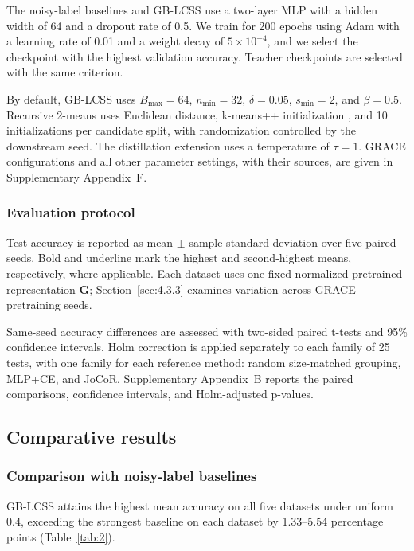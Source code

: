 \documentclass[times,review,10pt]{elsarticle}
\theoremstyle{definition}
\theoremstyle{plain}
\begin{document}
The noisy-label baselines and GB-LCSS use a two-layer MLP with a hidden width of 64 and a dropout rate of 0.5. We train for 200 epochs using Adam with a learning rate of 0.01 and a weight decay of \(5 \times 10^{- 4}\), and we select the checkpoint with the highest validation accuracy. Teacher checkpoints are selected with the same criterion.

By default, GB-LCSS uses \(B_{\max} = 64\), \(n_{\min} = 32\), \(\delta = 0.05\), \(s_{\min} = 2\), and \(\beta = 0.5\). Recursive 2-means uses Euclidean distance, k-means++ initialization \cite{ref71}, and 10 initializations per candidate split, with randomization controlled by the downstream seed. The distillation extension uses a temperature of \(\tau = 1\). GRACE configurations and all other parameter settings, with their sources, are given in Supplementary Appendix~F.

\subsubsection{Evaluation protocol}\label{sec:4.1.5}

Test accuracy is reported as mean \ensuremath{\pm} sample standard deviation over five paired seeds. Bold and underline mark the highest and second-highest means, respectively, where applicable. Each dataset uses one fixed normalized pretrained representation \(\mathbf G\); Section~\ref{sec:4.3.3} examines variation across GRACE pretraining seeds.

Same-seed accuracy differences are assessed with two-sided paired t-tests and 95\% confidence intervals. Holm correction \cite{ref72} is applied separately to each family of 25 tests, with one family for each reference method: random size-matched grouping, MLP+CE, and JoCoR. Supplementary Appendix~B reports the paired comparisons, confidence intervals, and Holm-adjusted p-values.

\subsection{Comparative results}\label{sec:4.2}

\subsubsection{Comparison with noisy-label baselines}\label{sec:4.2.1}

GB-LCSS attains the highest mean accuracy on all five datasets under uniform 0.4, exceeding the strongest baseline on each dataset by 1.33--5.54 percentage points (Table~\ref{tab:2}).
\end{document}
